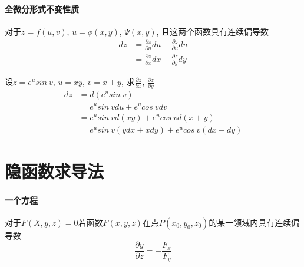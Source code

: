 \documentclass[main.tex]{subfiles}
\begin{document}
\paragraph{全微分形式不变性质} 对于$z = f(u, v)$, $u = \phi (x, y)$, $\Psi (x, y)$, 且这两个函数具有连续偏导数
\begin{align*}
    dz &= \frac{\partial z}{\partial u} du + \frac{\partial z}{\partial u} du \\
       &= \frac{\partial z}{\partial x} dx + \frac{\partial z}{\partial y} dy
\end{align*}

\begin{example}{设$z = e^u sin\ v$, $u = xy$, $v = x + y$, 求$\frac{\partial z}{\partial x}$, $\frac{\partial z}{\partial y}$}
    \begin{align*}
        dz &= d(e^u sin\ v) \\
           &= e^u sin\ v du + e^u cos\ v dv \\
           &= e^u sin\ v d(xy) + e^u cos\ v d(x + y) \\
           &= e^u sin\ v (ydx + xdy) + e^u cos\ v (dx + dy)
    \end{align*}
\end{example}

\section{隐函数求导法}
\paragraph{一个方程} 对于$F(X, y, z) = 0$若函数$F(x, y, z)$在点$P(x_0, y_0, z_0)$的某一领域内具有连续偏导数
\begin{equation}
    \frac{\partial y}{\partial z} = - \frac{F_x}{F_y} \tag{隐函数求导公式}
\end{equation}
\end{document}
